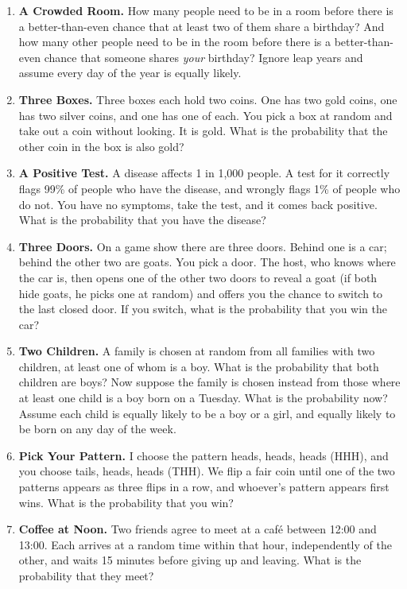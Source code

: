 \documentclass[11pt,a4paper]{article}
\begin{document}
\begin{enumerate}
    \item \textbf{A Crowded Room.} How many people need to be in a room before there is a better-than-even chance that at least two of them share a birthday? And how many other people need to be in the room before there is a better-than-even chance that someone shares \textit{your} birthday? Ignore leap years and assume every day of the year is equally likely.

    \item \textbf{Three Boxes.} Three boxes each hold two coins. One has two gold coins, one has two silver coins, and one has one of each. You pick a box at random and take out a coin without looking. It is gold. What is the probability that the other coin in the box is also gold?

    \item \textbf{A Positive Test.} A disease affects 1 in 1,000 people. A test for it correctly flags 99\% of people who have the disease, and wrongly flags 1\% of people who do not. You have no symptoms, take the test, and it comes back positive. What is the probability that you have the disease?

    \item \textbf{Three Doors.} On a game show there are three doors. Behind one is a car; behind the other two are goats. You pick a door. The host, who knows where the car is, then opens one of the other two doors to reveal a goat (if both hide goats, he picks one at random) and offers you the chance to switch to the last closed door. If you switch, what is the probability that you win the car?

    \item \textbf{Two Children.} A family is chosen at random from all families with two children, at least one of whom is a boy. What is the probability that both children are boys? Now suppose the family is chosen instead from those where at least one child is a boy born on a Tuesday. What is the probability now? Assume each child is equally likely to be a boy or a girl, and equally likely to be born on any day of the week.

    \item \textbf{Pick Your Pattern.} I choose the pattern heads, heads, heads (HHH), and you choose tails, heads, heads (THH). We flip a fair coin until one of the two patterns appears as three flips in a row, and whoever's pattern appears first wins. What is the probability that you win?

    \item \textbf{Coffee at Noon.} Two friends agree to meet at a café between 12:00 and 13:00. Each arrives at a random time within that hour, independently of the other, and waits 15 minutes before giving up and leaving. What is the probability that they meet?


\end{enumerate}
\end{document}
